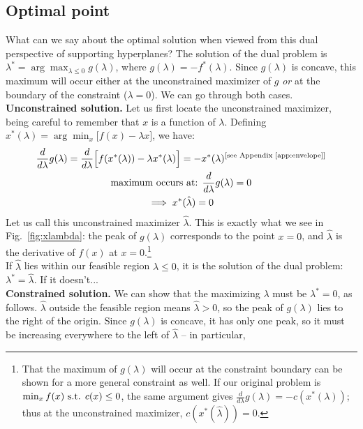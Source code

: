 \documentclass[11pt,a4paper,twoside]{scrartcl} %
\begin{document}
\subsection{Optimal point}
What can we say about the optimal solution when viewed from this dual perspective of supporting hyperplanes? The solution of the dual problem is $\lambda^* = \arg\max_{\lambda \leq 0} g(\lambda)$, where $g(\lambda) = -f^*(\lambda)$. Since $g(\lambda)$ is concave, this maximum will occur either at the unconstrained maximizer of $g$ \textit{or} at the boundary of the constraint ($\lambda = 0$). We can go through both cases.\\
\newline
\textbf{Unconstrained solution.} Let us first locate the
unconstrained maximizer, being careful to remember that $x$ is a function of $\lambda$. Defining $x^*(\lambda) = \arg\min_x\big[f(x) - \lambda x\big]$, we have:
\begin{gather*}
    \frac{d}{d\lambda}g(\lambda)
    = \frac{d}{d\lambda}\Big[f(x^*(\lambda)) - \lambda x^*(\lambda)\Big]
    = -x^*(\lambda)^{\textnormal{[see Appendix \ref{app:envelope}]}}\\
    \textnormal{maximum occurs at: } \frac{d}{d\lambda}g(\lambda) = 0\\
    \implies x^*(\hat\lambda) = 0
\end{gather*}
Let us call this unconstrained maximizer $\hat\lambda$. This is exactly what we see in Fig.~\ref{fig:xlambda}: the peak of $g(\lambda)$ corresponds to the point $x=0$, and $\hat\lambda$ is the derivative of $f(x)$ at $x=0$.\footnote{That the maximum of $g(\lambda)$ will occur at the constraint boundary can be shown for a more general constraint as well. If our original problem is $\min_x f(x) \textnormal{ s.t. } c(x) \leq 0$, the same argument
gives $\frac{d}{d\lambda}g(\lambda) = -c(x^*(\lambda))$; thus at the unconstrained maximizer, $c(x^*(\hat\lambda)) = 0$.}\\
If $\hat\lambda$ lies within our feasible region $\lambda \leq 0$, it is the solution of the dual problem: $\lambda^* = \hat\lambda$. If it doesn't...\\
\newline
\textbf{Constrained solution.} We can show that the
maximizing $\lambda$ must be $\lambda^* = 0$, as follows.
$\hat\lambda$ outside the feasible region means $\hat\lambda > 0$,
so the peak of $g(\lambda)$ lies to the right of the origin. Since
$g(\lambda)$ is concave, it has only one peak, so it must be
increasing everywhere to the left of $\hat\lambda$ -- in particular,
\end{document}
